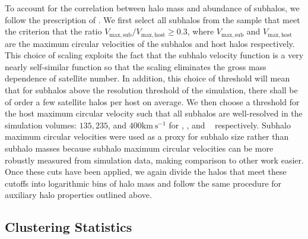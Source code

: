 \documentclass[usenatbib,fleqn]{mnras}
\begin{document}
To account for the correlation between halo mass and abundance of subhalos, we follow the prescription of \citet{wechsler_etal06}. We first select all subhalos from the sample
that meet the criterion that the ratio $V_{\mathrm{max,sub}}/V_{\mathrm{max,host}} \ge 0.3$, where
$V_{\mathrm{max,sub}}$ and $V_{\mathrm{max,host}}$ are the maximum circular velocities of the subhalos and host halos respectively.
This choice of scaling exploits the fact that the subhalo velocity function is a very nearly self-similar function \citep{zentner_etal05,mao_etal15}
so that the scaling eliminates the gross mass dependence of satellite number.
In addition, this choice of threshold will mean that for subhalos above the resolution threshold of the simulation, there shall be of order a few satellite halos per host on average. We then choose
a threshold for the host maximum circular velocity such that all subhalos are well-resolved in the simulation volumes: $135, 235$, and $400 \mathrm{km \ s^{-1}}$ for \simA, \simB, and \simC~ respectively. Subhalo maximum circular velocities were used as a proxy for subhalo size rather than subhalo masses because subhalo maximum circular velocities can be more robustly measured from simulation data, making comparison to other work easier. Once these cuts have been applied, we again divide the halos that meet these cutoffs into logarithmic bins of halo mass and follow the same procedure for auxiliary halo properties outlined above. 

\subsection{Clustering Statistics}
\label{subsection:clusteringstatistics}
\end{document}
